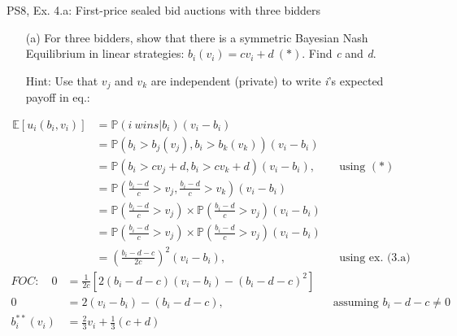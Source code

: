 \begin{frame}{PS8, Ex. 4.a: First-price sealed bid auctions with three bidders}
    \begin{itemize}
      \item[(a)] For three bidders, show that there is a symmetric Bayesian Nash Equilibrium in linear strategies: $b_i(v_i) = cv_i + d\ (*)$. Find \textit{c} and \textit{d}.
      \item[Hint:] Use that $v_j$ and $v_k$ are independent (private) to write \textit{i}'s expected payoff in eq.:
    \end{itemize}
    \vspace{-10pt}
    \begin{align*}
      \mathbb{E}[u_i(b_i,v_i)]
      &=\mathbb{P}(i\ wins|b_i)(v_i-b_i)\\
      &=\mathbb{P}\left(b_i>b_j(v_j),b_i>b_k(v_k)\right)(v_i-b_i)\\
      &=\mathbb{P}(b_i>cv_j+d,b_i>cv_k+d)(v_i-b_i),&&\text{using }(*)\\
      &=\mathbb{P}\left(\frac{b_i-d}{c}>v_j,\frac{b_i-d}{c}>v_k\right)(v_i-b_i)\\
      &=\mathbb{P}\left(\frac{b_i-d}{c}>v_j\right)\times\mathbb{P}\left(\frac{b_i-d}{c}>v_j\right)(v_i-b_i)\\
      &=\mathbb{P}\left(\frac{b_i-d}{c}>v_j\right)\times\mathbb{P}\left(\frac{b_i-d}{c}>v_j\right)(v_i-b_i)\\
      &=\left(\frac{b_i-d-c}{2c}\right)^2(v_i-b_i),&&\text{using ex. (3.a)}
    \end{align*}
    \vspace{-8pt}
    \begin{align*}
      FOC:\quad   0&=\frac{1}{2c}[2(b_i-d-c)(v_i-b_i)-(b_i-d-c)^2]\\
                  0&=2(v_i-b_i)-(b_i-d-c),&&\text{assuming }b_i-d-c\neq0\\
      b_i^{**}(v_i)&=\frac{2}{3}v_i+\frac{1}{3}(c+d)
    \end{align*}
    \vfill\null
\end{frame}
